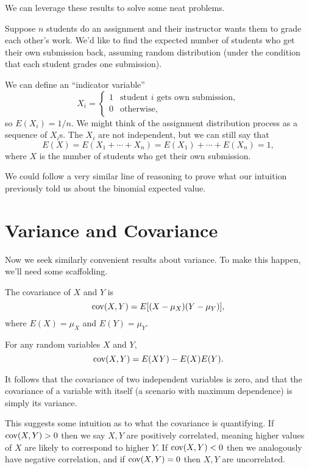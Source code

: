 \documentclass[../m157main.tex]{subfiles}
\begin{document}
We can leverage these results to solve some neat problems.

\begin{example}
    Suppose $n$ students do an assignment and their instructor wants them to grade each other's work.
    We'd like to find the expected number of students who get their own submission back, assuming random distribution (under the condition that each student grades one submission).

    We can define an ``indicator variable''
    \[ X_i = \begin{cases} 1 & \textrm{student $i$ gets own submission}, \\ 0 & \textrm{otherwise}, \end{cases} \]
    so $E(X_i) = 1 / n$.
    We might think of the assignment distribution process as a sequence of $X_i$s.
    The $X_i$ are not independent, but we can still say that
    \[ E(X) = E(X_1 + \cdots + X_n) = E(X_1) + \cdots + E(X_n) = 1, \]
    where $X$ is the number of students who get their own submission.
\end{example}

We could follow a very similar line of reasoning to prove what our intuition previously told us about the binomial expected value.

\section{Variance and Covariance}
Now we seek similarly convenient results about variance.
To make this happen, we'll need some scaffolding.

\begin{definition}[Covariance]
    The covariance of $X$ and $Y$ is
    \[ \operatorname{cov}(X,Y) = E[(X - \mu_X)(Y - \mu_Y)], \]
    where $E(X) = \mu_X$ and $E(Y) = \mu_Y$.
\end{definition}

\begin{theorem}
    For any random variables $X$ and $Y$,
    \[ \operatorname{cov}(X,Y) = E(XY) - E(X) E(Y). \]
\end{theorem}

It follows that the covariance of two independent variables is zero, and that the covariance of a variable with itself (a scenario with maximum dependence) is simply its variance.

This suggests some intuition as to what the covariance is quantifying.
If $\operatorname{cov} (X,Y) > 0$ then we say $X,Y$ are positively correlated, meaning higher values of $X$ are likely to correspond to higher $Y$.
If $\operatorname{cov}(X,Y) < 0$ then we analogously have negative correlation, and if $\operatorname{cov}(X,Y) = 0$ then $X,Y$ are uncorrelated.
\end{document}
